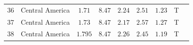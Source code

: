 \documentclass[12pt]{article}
\begin{document}
{\begin{table}[H]
{\begin{tabular}{ c c c c c c c c c }
         36 &   Central America  &  $1.71$ & $8.47$ & $2.24$ & $2.51$ & $1.23$ &T \\     
         37 &   Central America  & $1.73$ & $8.47$ & $2.17$ & $2.57$ & $1.27$ & T\\                       
          38 &  Central America   & $1.795$ & $8.47$ & $2.26$ & $2.45$ & $1.19$ &T\\              
   	\hline %
		\end{tabular}
        }
		\label{table:force_balance} %
\end{table}







}
\end{document}
